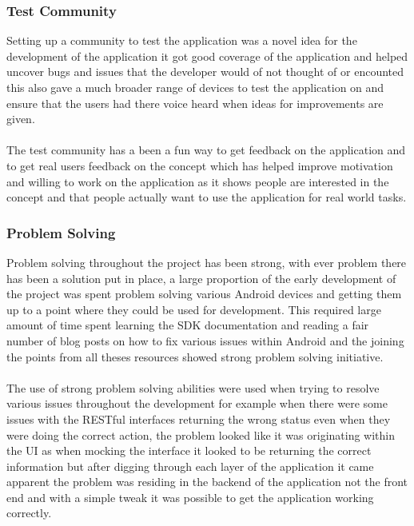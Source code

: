 \subsubsection{Test Community}

Setting up a community to test the application was a novel idea for the development of the application it got good coverage of the application and helped uncover bugs and issues that the developer would of not thought of or encounted this also gave a much broader range of devices to test the application on and ensure that the users had there voice heard when ideas for improvements are given.\\
\\
The test community has a been a fun way to get feedback on the application and to get real users feedback on the concept which has helped improve motivation and willing to work on the application as it shows people are interested in the concept and that people actually want to use the application for real world tasks.

\subsubsection{Problem Solving}

Problem solving throughout the project has been strong, with ever problem there has been a solution put in place, a large proportion of the early development of the project was spent problem solving various Android devices and getting them up to a point where they could be used for development. This required large amount of time spent learning the SDK documentation and reading a fair number of blog posts on how to fix various issues within Android and the joining the points from all theses resources showed strong problem solving initiative.\\
\\
The use of strong problem solving abilities were used when trying to resolve various issues throughout the development for example when there were some issues with the RESTful interfaces returning the wrong status even when they were doing the correct action, the problem looked like it was originating within the UI as when mocking the interface it looked to be returning the correct information but after digging through each layer of the application it came apparent the problem was residing in the backend of the application not the front end and with a simple tweak it was possible to get the application working correctly.

